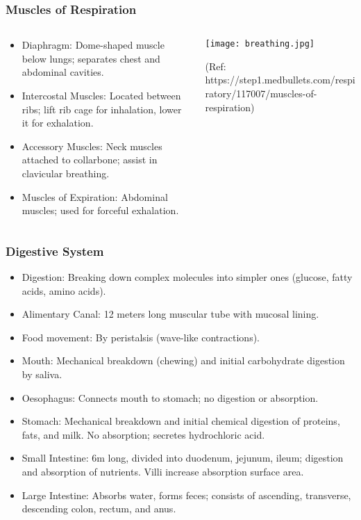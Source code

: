 \begin{frame}[fragile]\frametitle{Muscles of Respiration}
\begin{columns}
    \begin{column}[T]{0.5\linewidth}
      \begin{itemize}
		\item Diaphragm: Dome-shaped muscle below lungs; separates chest and abdominal cavities.
		\item Intercostal Muscles: Located between ribs; lift rib cage for inhalation, lower it for exhalation.
		\item Accessory Muscles: Neck muscles attached to collarbone; assist in clavicular breathing.
		\item Muscles of Expiration: Abdominal muscles; used for forceful exhalation.
	  \end{itemize}
    \end{column}
    \begin{column}[T]{0.5\linewidth}
		\begin{center}
		\texttt{[image: breathing.jpg]}
		
		{\tiny (Ref: https://step1.medbullets.com/respiratory/117007/muscles-of-respiration)}
		\end{center}	
    \end{column}
  \end{columns}
\end{frame}

\begin{frame}[fragile]\frametitle{Digestive System}

      \begin{itemize}
		\item Digestion: Breaking down complex molecules into simpler ones (glucose, fatty acids, amino acids).
		\item Alimentary Canal: 12 meters long muscular tube with mucosal lining.
		\item Food movement: By peristalsis (wave-like contractions).
		\item Mouth: Mechanical breakdown (chewing) and initial carbohydrate digestion by saliva.
		\item Oesophagus: Connects mouth to stomach; no digestion or absorption.
		\item Stomach: Mechanical breakdown and initial chemical digestion of proteins, fats, and milk. No absorption; secretes hydrochloric acid.
		\item Small Intestine: 6m long, divided into duodenum, jejunum, ileum; digestion and absorption of nutrients. Villi increase absorption surface area.
		\item Large Intestine: Absorbs water, forms feces; consists of ascending, transverse, descending colon, rectum, and anus.
	  \end{itemize}

\end{frame}

